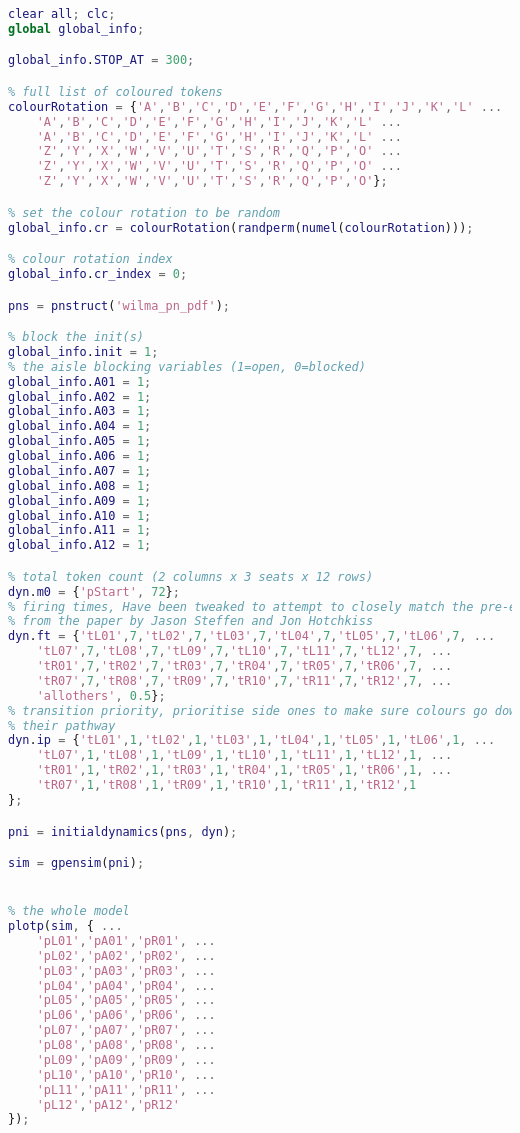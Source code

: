 \begin{lstlisting}[language=MATLAB, caption=wilma.m]
clear all; clc;
global global_info;

global_info.STOP_AT = 300;

% full list of coloured tokens
colourRotation = {'A','B','C','D','E','F','G','H','I','J','K','L' ...
    'A','B','C','D','E','F','G','H','I','J','K','L' ...
    'A','B','C','D','E','F','G','H','I','J','K','L' ...
    'Z','Y','X','W','V','U','T','S','R','Q','P','O' ...
    'Z','Y','X','W','V','U','T','S','R','Q','P','O' ...
    'Z','Y','X','W','V','U','T','S','R','Q','P','O'};

% set the colour rotation to be random
global_info.cr = colourRotation(randperm(numel(colourRotation)));

% colour rotation index
global_info.cr_index = 0;

pns = pnstruct('wilma_pn_pdf');

% block the init(s)
global_info.init = 1;
% the aisle blocking variables (1=open, 0=blocked)
global_info.A01 = 1;
global_info.A02 = 1;
global_info.A03 = 1;
global_info.A04 = 1;
global_info.A05 = 1;
global_info.A06 = 1;
global_info.A07 = 1;
global_info.A08 = 1;
global_info.A09 = 1;
global_info.A10 = 1;
global_info.A11 = 1;
global_info.A12 = 1;

% total token count (2 columns x 3 seats x 12 rows)
dyn.m0 = {'pStart', 72};
% firing times, Have been tweaked to attempt to closely match the pre-existing results
% from the paper by Jason Steffen and Jon Hotchkiss
dyn.ft = {'tL01',7,'tL02',7,'tL03',7,'tL04',7,'tL05',7,'tL06',7, ...
    'tL07',7,'tL08',7,'tL09',7,'tL10',7,'tL11',7,'tL12',7, ...
    'tR01',7,'tR02',7,'tR03',7,'tR04',7,'tR05',7,'tR06',7, ...
    'tR07',7,'tR08',7,'tR09',7,'tR10',7,'tR11',7,'tR12',7, ...
    'allothers', 0.5};
% transition priority, prioritise side ones to make sure colours go down
% their pathway
dyn.ip = {'tL01',1,'tL02',1,'tL03',1,'tL04',1,'tL05',1,'tL06',1, ...
    'tL07',1,'tL08',1,'tL09',1,'tL10',1,'tL11',1,'tL12',1, ...
    'tR01',1,'tR02',1,'tR03',1,'tR04',1,'tR05',1,'tR06',1, ...
    'tR07',1,'tR08',1,'tR09',1,'tR10',1,'tR11',1,'tR12',1
};

pni = initialdynamics(pns, dyn);

sim = gpensim(pni);


% the whole model
plotp(sim, { ...
    'pL01','pA01','pR01', ...
    'pL02','pA02','pR02', ...
    'pL03','pA03','pR03', ...
    'pL04','pA04','pR04', ...
    'pL05','pA05','pR05', ...
    'pL06','pA06','pR06', ...
    'pL07','pA07','pR07', ...
    'pL08','pA08','pR08', ...
    'pL09','pA09','pR09', ...
    'pL10','pA10','pR10', ...
    'pL11','pA11','pR11', ...
    'pL12','pA12','pR12'
});



\end{lstlisting}
